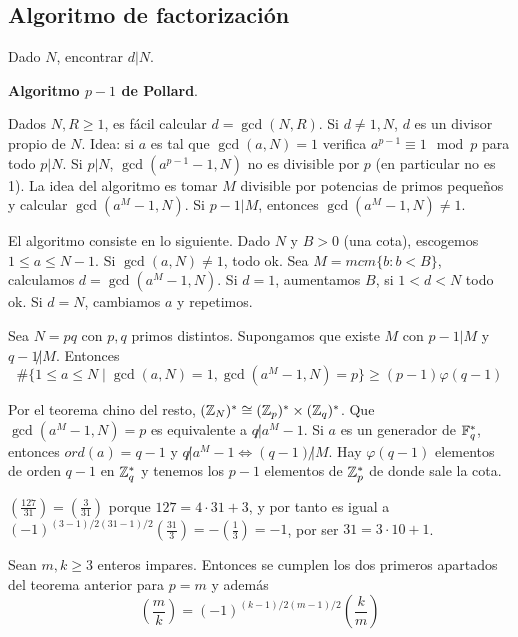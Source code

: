\documentclass[CR.tex]{subfiles}
\begin{document}
\subsection{Algoritmo de factorización}
Dado $N$, encontrar $d|N$. 

\textbf{Algoritmo $p-1$ de Pollard}.

Dados $N,R\geq 1$, es fácil calcular $d=\gcd(N,R)$. Si $d\neq 1,N$, $d$ es un divisor propio de $N$. Idea: si $a$ es tal que $\gcd(a,N)=1$ verifica $a^{p-1}\equiv 1\mod p$ para todo $p|N$. Si $p|N$, $\gcd(a^{p-1}-1,N)$ no es divisible por $p$ (en particular no es 1). La idea del algoritmo es tomar $M$ divisible por potencias de primos pequeños y calcular $\gcd(a^M-1,N)$. Si $p-1|M$, entonces $\gcd(a^M-1,N)\neq 1$. 

El algoritmo consiste en lo siguiente. Dado $N$ y $B>0$ (una cota), escogemos $1\leq a\leq N-1$. Si $\gcd(a,N)\neq 1$, todo ok. Sea $M=mcm\{b:b<B\}$, calculamos $d=\gcd(a^M-1,N)$. Si $d=1$, aumentamos $B$, si $1<d<N$ todo ok. Si $d=N$, cambiamos $a$ y repetimos. 

\begin{prop}
Sea $N=pq$ con $p,q$ primos distintos. Supongamos que existe $M$ con $p-1|M$ y $q-1\not| M$. Entonces
\[
\#\{1\leq a\leq N\mid\gcd(a,N)=1, \gcd(a^M-1,N)=p\}\geq (p-1)\varphi(q-1)
\]
\end{prop}
\begin{dem}
Por el teorema chino del resto, $(\mathbb{Z}_N)^*\cong(\mathbb{Z}_p)^*\times(\mathbb{Z}_q)^*$. Que $\gcd(a^M-1,N)=p$ es equivalente a $q\not| a^M-1$. Si $a$ es un generador de $\mathbb{F}_q^*$, entonces $ord(a)=q-1$ y $q\not| a^M-1\Leftrightarrow (q-1)\not| M$. Hay $\varphi(q-1)$ elementos de orden $q-1$ en $\mathbb{Z}_q^*$ y tenemos los $p-1$ elementos de $\mathbb{Z}_p^*$ de donde sale la cota.
\end{dem}



\begin{ej}
$(\frac{127}{31})=(\frac{3}{31})$ porque $127=4\cdot 31+3$, y por tanto es igual a $(-1)^{(3-1)/2 (31-1)/2}(\frac{31}{3})=-(\frac{1}{3})=-1$, por ser $31=3\cdot 10+1$.
\end{ej}

\begin{teorema}
Sean $m,k\geq 3$ enteros impares. Entonces se cumplen los dos primeros apartados del teorema anterior para $p=m$ y además
\[
(\frac{m}{k})=(-1)^{(k-1)/2 (m-1)/2}(\frac{k}{m})
\]
\end{teorema}
\end{document}
